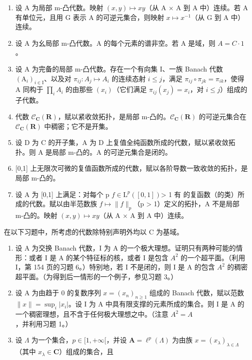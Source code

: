 \begin{enumerate}
\def\labelenumi{\alph{enumi})}
\setcounter{enumi}{1}
\item
  设 A 为局部 m-凸代数。映射 \((x,y)\mapsto xy\)（从 A × A 到 A 中）连续。若 A 有单位元，且用 G 表示 A 的可逆元集合，则映射 \(x\mapsto x^{-1}\)（从 G 到 A 中）连续。
\item
  设 A 为幺局部 m-凸代数。A 的每个元素的谱非空。若 A 是域，则 \(A = C \cdot 1\)。
\item
  设 A 为完备的局部 m-凸代数。存在一个有向集 I、一族 Banach 代数 \((\mathrm{A}_{i})_{i\in\mathrm{I}}\)、以及对 \(\pi_{ij}\colon A_{j}\mapsto A_{i}\) 的连续态射 \(i\leqslant j\)，满足 \(\pi_{ij}\circ\pi_{jk}=\pi_{ik}\)，使得 A 同构于 \(\prod_{i}A_{i}\) 的由那些 \((x_{i})\)（它们满足 \(\pi_{ij}(x_{j})=x_{i}\)，对 \(i\leqslant j\)）组成的子代数。
\item
  代数 \(\mathcal{C}_{\mathbf{C}}(\mathbf{R})\)，赋以紧收敛拓扑，是局部 m-凸的。\(\mathcal{C}_{\mathbf{C}}(\mathbf{R})\) 的可逆元集合在 \(\mathcal{C}_{\mathbf{C}}(\mathbf{R})\) 中稠密；它不是开集。
\item
  设 D 为 C 的开子集，A 为 D 上复值全纯函数所成的代数，赋以紧收敛拓扑。则 A 是局部 m-凸的。A 的可逆元集合是闭的。
\item
  {[}0,1{]} 上无限次可微的复值函数所成的代数，赋以各阶导数一致收敛的拓扑，是局部 m-凸的。
\item
  设 A 为 {[}0,1{]} 上满足：对每个 p \(f \in \mathrm{L}^{p}([0,1])\)\textgreater{ 1 有 } 的复函数（的类）所成的代数。赋以由半范数族 \(f \mapsto \|f\|_{p}\)（p \textgreater{} 1）定义的拓扑，A 不是局部 m-凸的。映射 \((x,y) \mapsto xy\)（从 A × A 到 A 中）连续。
\end{enumerate}


在以下习题中，所考虑的代数除特别声明外均以 C 为基域。

\begin{enumerate}
\def\labelenumi{\arabic{enumi})}
\item
  设 A 为交换 Banach 代数，I 为 A 的一个极大理想。证明只有两种可能的情形：或者 I 是 A 的某个特征标的核，或者 I 是包含 \(A^{2}\) 的一个超平面。（利用 I，第 154 页的习题 6。）特别地，若 I 不是闭的，则 I 是 A 的包含 \(A^{2}\) 的稠密超平面。（为得到后一情形的一个例子，参见习题 3。）
\item
  设 A 为由趋于 0 的复数序列 \(x = (x_{n})_{n \geqslant 1}\) 组成的 Banach 代数，赋以范数 \(\|x\| = \sup_{i} |x_{i}|\)。设 I 为 A 中具有限支撑的元素所成的集合。则 I 是 A 的一个稠密理想，且不含于任何极大理想之中。（注意 \(A^{2} = A\)，并利用习题 1。）
\item
  设 \(\Lambda\) 为一个集合，\(p \in [1, +\infty[\)，并设 \(\mathbf{A} = \ell^p(\Lambda)\) 为由族 \(x = (x_{\lambda})_{\lambda \in \Lambda}\)（其中 \(x_{\lambda} \in \mathbf{C}\)）组成的集合，且
\end{enumerate}

